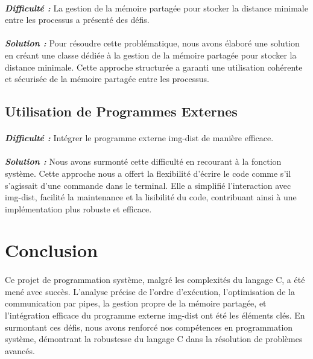 \documentclass{article}
\begin{document}
\paragraph{}\textit{\textbf{Difficulté :}} La gestion de la mémoire partagée pour stocker la distance minimale entre les processus a présenté des défis.
\paragraph{}\textit{\textbf{Solution :}} Pour résoudre cette problématique, nous avons élaboré une solution en créant une classe dédiée à la gestion de la mémoire partagée pour stocker la distance minimale. Cette approche structurée a garanti une utilisation cohérente et sécurisée de la mémoire partagée entre les processus. 
\paragraph{}
\subsection{Utilisation de Programmes Externes}
\paragraph{}\textit{\textbf{Difficulté :}} Intégrer le programme externe img-dist de manière efficace. 
\paragraph{}\textit{\textbf{Solution :}} Nous avons surmonté cette difficulté en recourant à la fonction système. Cette approche nous a offert la flexibilité d'écrire le code comme s'il s'agissait d'une commande dans le terminal. Elle a simplifié l'interaction avec img-dist, facilité la maintenance et la lisibilité du code, contribuant ainsi à une implémentation plus robuste et efficace. 

\hspace{1cm}
\section{Conclusion}
\paragraph{}Ce projet de programmation système, malgré les complexités du langage C, a été mené avec succès. L'analyse précise de l'ordre d'exécution, l'optimisation de la communication par pipes, la gestion propre de la mémoire partagée, et l'intégration efficace du programme externe img-dist ont été les éléments clés. En surmontant ces défis, nous avons renforcé nos compétences en programmation système, démontrant la robustesse du langage C dans la résolution de problèmes avancés. 
\end{document}
